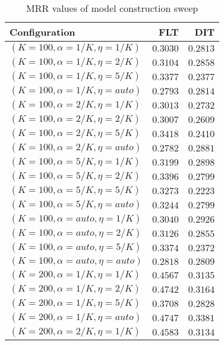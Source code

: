 
\begin{table}
\begin{spacing}{1.2}
\centering
\caption{MRR values of \tika model construction sweep}
\label{table:tika_model_sweep}
\vspace{0.2em}
\parbox{.45\linewidth}{\centering \begin{tabular}{lrr}
\toprule
                   Configuration &           FLT &      DIT \\
\midrule
   $(K=100,\alpha=1/K,\eta=1/K)$ &      $0.3030$ & $0.2813$ \\
   $(K=100,\alpha=1/K,\eta=2/K)$ &      $0.3104$ & $0.2858$ \\
   $(K=100,\alpha=1/K,\eta=5/K)$ &      $0.3377$ & $0.2377$ \\
  $(K=100,\alpha=1/K,\eta=auto)$ &      $0.2793$ & $0.2814$ \\
   $(K=100,\alpha=2/K,\eta=1/K)$ &      $0.3013$ & $0.2732$ \\
   $(K=100,\alpha=2/K,\eta=2/K)$ &      $0.3007$ & $0.2609$ \\
   $(K=100,\alpha=2/K,\eta=5/K)$ &      $0.3418$ & $0.2410$ \\
  $(K=100,\alpha=2/K,\eta=auto)$ &      $0.2782$ & $0.2881$ \\
   $(K=100,\alpha=5/K,\eta=1/K)$ &      $0.3199$ & $0.2898$ \\
   $(K=100,\alpha=5/K,\eta=2/K)$ &      $0.3396$ & $0.2799$ \\
   $(K=100,\alpha=5/K,\eta=5/K)$ &      $0.3273$ & $0.2223$ \\
  $(K=100,\alpha=5/K,\eta=auto)$ &      $0.3244$ & $0.2799$ \\
  $(K=100,\alpha=auto,\eta=1/K)$ &      $0.3040$ & $0.2926$ \\
  $(K=100,\alpha=auto,\eta=2/K)$ &      $0.3126$ & $0.2855$ \\
  $(K=100,\alpha=auto,\eta=5/K)$ &      $0.3374$ & $0.2372$ \\
 $(K=100,\alpha=auto,\eta=auto)$ &      $0.2818$ & $0.2809$ \\
   $(K=200,\alpha=1/K,\eta=1/K)$ &      $0.4567$ & $0.3135$ \\
   $(K=200,\alpha=1/K,\eta=2/K)$ &      $0.4742$ & $0.3164$ \\
   $(K=200,\alpha=1/K,\eta=5/K)$ &      $0.3708$ & $0.2828$ \\
  $(K=200,\alpha=1/K,\eta=auto)$ &      $0.4747$ & $0.3381$ \\
   $(K=200,\alpha=2/K,\eta=1/K)$ &      $0.4583$ & $0.3134$ \\

\end{tabular}}
\end{spacing}
\end{table}
